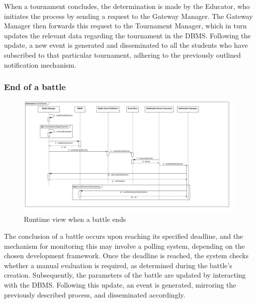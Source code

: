 When a tournament concludes, the determination is made by the Educator, who initiates the process by sending a request to the Gateway Manager. The Gateway Manager then forwards this request to the Tournament Manager, which in turn updates the relevant data regarding the tournament in the DBMS. Following the update, a new event is generated and disseminated to all the students who have subscribed to that particular tournament, adhering to the previously outlined notification mechanism.

\newpage

\subsubsection*{End of a battle}
\begin{figure}[h!]
    \centering
    \includegraphics[width=1.3\linewidth, angle=90]{2.ArchitecturalDesign/res/EndOfABattle.jpg}
    \caption{Runtime view when a battle ends}
    \label{fig:battle_end}
\end{figure}

The conclusion of a battle occurs upon reaching its specified deadline, and the mechanism for monitoring this may involve a polling system, depending on the chosen development framework. Once the deadline is reached, the system checks whether a manual evaluation is required, as determined during the battle's creation. Subsequently, the parameters of the battle are updated by interacting with the DBMS. Following this update, an event is generated, mirroring the previously described process, and disseminated accordingly.

\newpage

